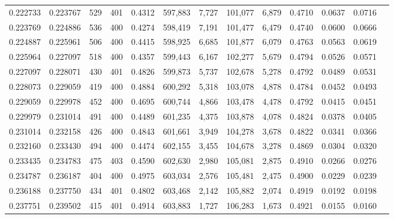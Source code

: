 \begin{tabular}{rrrrrrrrrrrrr}
0.222733 & 0.223767 &   529 & 401 &                                     0.4312 & 597,883 &   7,727 & 101,077 &   6,879 & 0.4710 & 0.0637 & 0.0716 \\
0.223769 & 0.224886 &   536 & 400 &                                     0.4274 & 598,419 &   7,191 & 101,477 &   6,479 & 0.4740 & 0.0600 & 0.0666 \\
0.224887 & 0.225961 &   506 & 400 &                                     0.4415 & 598,925 &   6,685 & 101,877 &   6,079 & 0.4763 & 0.0563 & 0.0619 \\
0.225964 & 0.227097 &   518 & 400 &                                     0.4357 & 599,443 &   6,167 & 102,277 &   5,679 & 0.4794 & 0.0526 & 0.0571 \\
0.227097 & 0.228071 &   430 & 401 &                                     0.4826 & 599,873 &   5,737 & 102,678 &   5,278 & 0.4792 & 0.0489 & 0.0531 \\
0.228073 & 0.229059 &   419 & 400 &                                     0.4884 & 600,292 &   5,318 & 103,078 &   4,878 & 0.4784 & 0.0452 & 0.0493 \\
0.229059 & 0.229978 &   452 & 400 &                                     0.4695 & 600,744 &   4,866 & 103,478 &   4,478 & 0.4792 & 0.0415 & 0.0451 \\
0.229979 & 0.231014 &   491 & 400 &                                     0.4489 & 601,235 &   4,375 & 103,878 &   4,078 & 0.4824 & 0.0378 & 0.0405 \\
0.231014 & 0.232158 &   426 & 400 &                                     0.4843 & 601,661 &   3,949 & 104,278 &   3,678 & 0.4822 & 0.0341 & 0.0366 \\
0.232160 & 0.233430 &   494 & 400 &                                     0.4474 & 602,155 &   3,455 & 104,678 &   3,278 & 0.4869 & 0.0304 & 0.0320 \\
0.233435 & 0.234783 &   475 & 403 &                                     0.4590 & 602,630 &   2,980 & 105,081 &   2,875 & 0.4910 & 0.0266 & 0.0276 \\
0.234787 & 0.236187 &   404 & 400 &                                     0.4975 & 603,034 &   2,576 & 105,481 &   2,475 & 0.4900 & 0.0229 & 0.0239 \\
0.236188 & 0.237750 &   434 & 401 &                                     0.4802 & 603,468 &   2,142 & 105,882 &   2,074 & 0.4919 & 0.0192 & 0.0198 \\
0.237751 & 0.239502 &   415 & 401 &                                     0.4914 & 603,883 &   1,727 & 106,283 &   1,673 & 0.4921 & 0.0155 & 0.0160 \\

\end{tabular}
